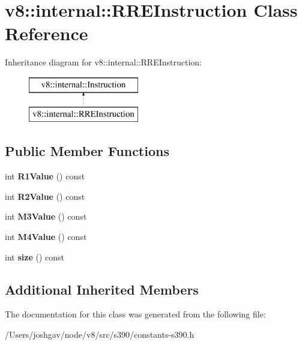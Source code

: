 \hypertarget{classv8_1_1internal_1_1_r_r_e_instruction}{}\section{v8\+:\+:internal\+:\+:R\+R\+E\+Instruction Class Reference}
\label{classv8_1_1internal_1_1_r_r_e_instruction}
Inheritance diagram for v8\+:\+:internal\+:\+:R\+R\+E\+Instruction\+:\begin{figure}[H]
\begin{center}
\leavevmode
\includegraphics[height=2.000000cm]{classv8_1_1internal_1_1_r_r_e_instruction}
\end{center}
\end{figure}
\subsection*{Public Member Functions}
\begin{DoxyCompactItemize}
\item 
int {\bfseries R1\+Value} () const \hypertarget{classv8_1_1internal_1_1_r_r_e_instruction_a872d439625c9a2aaadf02c098e1431fd}{}\label{classv8_1_1internal_1_1_r_r_e_instruction_a872d439625c9a2aaadf02c098e1431fd}

\item 
int {\bfseries R2\+Value} () const \hypertarget{classv8_1_1internal_1_1_r_r_e_instruction_a628e9cb796e92f36c10485bccc0575c3}{}\label{classv8_1_1internal_1_1_r_r_e_instruction_a628e9cb796e92f36c10485bccc0575c3}

\item 
int {\bfseries M3\+Value} () const \hypertarget{classv8_1_1internal_1_1_r_r_e_instruction_a90ef77372fb952afa1a846423270dafc}{}\label{classv8_1_1internal_1_1_r_r_e_instruction_a90ef77372fb952afa1a846423270dafc}

\item 
int {\bfseries M4\+Value} () const \hypertarget{classv8_1_1internal_1_1_r_r_e_instruction_a1afb9f5c5c9cba688bc36f59b89740c3}{}\label{classv8_1_1internal_1_1_r_r_e_instruction_a1afb9f5c5c9cba688bc36f59b89740c3}

\item 
int {\bfseries size} () const \hypertarget{classv8_1_1internal_1_1_r_r_e_instruction_ac37f9c7a421dbf3ce6b4221beca43e1f}{}\label{classv8_1_1internal_1_1_r_r_e_instruction_ac37f9c7a421dbf3ce6b4221beca43e1f}

\end{DoxyCompactItemize}
\subsection*{Additional Inherited Members}


The documentation for this class was generated from the following file\+:\begin{DoxyCompactItemize}
\item 
/\+Users/joshgav/node/v8/src/s390/constants-\/s390.\+h\end{DoxyCompactItemize}
